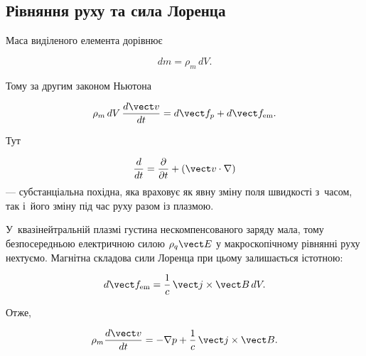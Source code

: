 \subsection{Рівняння руху та сила Лоренца}



Маса виділеного елемента дорівнює

\begin{equation*}
    dm=\rho_m\,dV.
\end{equation*}

Тому за другим законом Ньютона

\begin{equation*}
    \rho_m\,dV\,\frac{d\vect v}{dt}
    =
    d\vect f_p+d\vect f_{\mathrm{em}}.
\end{equation*}

Тут

\begin{equation*}
    \frac{d}{dt}
    =
    \frac{\partial}{\partial t}
    +(\vect v\cdot\nabla)
\end{equation*}
--- субстанціальна похідна, яка враховує як явну зміну поля швидкості з~часом, так і~його
зміну під час руху разом із плазмою.

У~квазінейтральній плазмі густина нескомпенсованого заряду мала, тому безпосередньою
електричною силою $\rho_q\vect E$ у макроскопічному рівнянні руху нехтуємо. Магнітна
складова сили Лоренца при цьому залишається істотною:

\begin{equation*}
    d\vect f_{\mathrm{em}}
    =
    \frac{1}{c}\,\vect j\times\vect B\,dV.
\end{equation*}

Отже,

\begin{equation*}
    \rho_m\frac{d\vect v}{dt}
    =
    -\nabla p
    +
    \frac{1}{c}\,\vect j\times\vect B.
\end{equation*}


